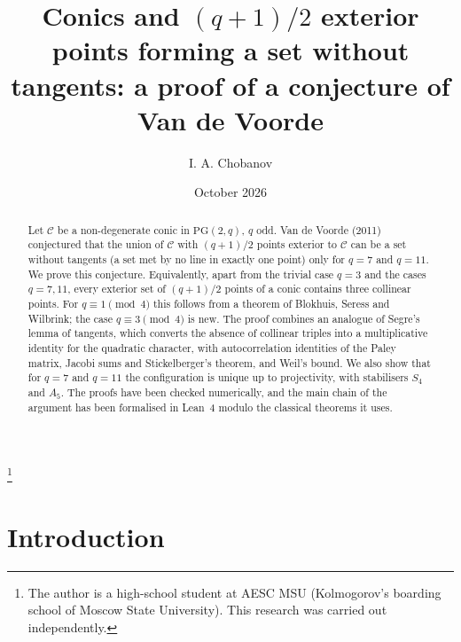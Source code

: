 \documentclass[11pt]{amsart}
\theoremstyle{definition}
\theoremstyle{remark}
\numberwithin{equation}{section}
\newcommand{\PGtwo}{\mathrm{PG}(2,q)}
\newcommand{\Con}{\mathcal{C}}
\begin{document}
\title[A proof of Van de Voorde's conjecture]{Conics and $(q+1)/2$ exterior points forming a set without tangents:
a proof of a conjecture of Van de Voorde}

\author{I. A. Chobanov}
\address{The Advanced Educational Scientific Center (faculty) -- Kolmogorov's boarding school of Moscow State
University, Moscow, Russia}
\thanks{The author is a high-school student at AESC MSU (Kolmogorov's boarding school of Moscow State University). This research was carried out independently.}

\date{October 2026}

\begin{abstract}
Let $\Con$ be a non-degenerate conic in $\PGtwo$, $q$ odd. Van de Voorde (2011) conjectured that the union of $\Con$ with
$(q+1)/2$ points exterior to $\Con$ can be a set without tangents (a set met by no line in exactly one point) only for
$q=7$ and $q=11$. We prove this conjecture. Equivalently, apart from the trivial case $q=3$ and the cases $q=7,11$, every
exterior set of $(q+1)/2$ points of a conic contains three collinear points. For $q\equiv1\pmod 4$ this follows from a theorem
of Blokhuis, Seress and Wilbrink; the case $q\equiv3\pmod4$ is new. The proof combines an analogue of Segre's lemma of
tangents, which converts the absence of collinear triples into a multiplicative identity for the quadratic character,
with autocorrelation identities of the Paley matrix, Jacobi sums and Stickelberger's theorem, and Weil's bound. We also show
that for $q=7$ and $q=11$ the configuration is unique up to projectivity, with stabilisers $S_4$ and $A_5$. The proofs have
been checked numerically, and the main chain of the argument has been formalised in Lean~4 modulo the classical theorems it
uses.
\end{abstract}

\maketitle

\section{Introduction}\label{sec:intro}
\end{document}
